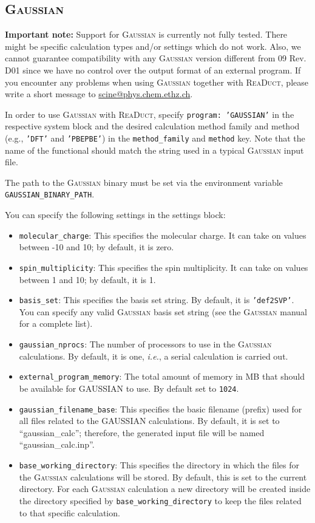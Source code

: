 \documentclass[]{tufte-book}
\begin{document}
\subsection{\textsc{Gaussian}}

\textbf{Important note:} Support for \textsc{Gaussian}\cite{gaussian09} is currently not fully tested. There might be specific calculation
types and/or settings which do not work. Also, we cannot guarantee compatibility with any \textsc{Gaussian} version different from
09 Rev. D01 since we have no control over the output format of an external program. If you encounter any problems when
using \textsc{Gaussian} together with \textsc{ReaDuct}, please write a short message to \href{scine@phys.chem.ethz.ch}{scine@phys.chem.ethz.ch}.

In order to use \textsc{Gaussian} with \textsc{ReaDuct}, specify \texttt{program: 'GAUSSIAN'} in the respective system block and the desired
calculation method family and method (e.g., \texttt{'DFT'} and \texttt{'PBEPBE'}) in the \texttt{method\_family} and \texttt{method} key.
Note that the name of the functional should match the string used in a typical \textsc{Gaussian} input file.

The path to the \textsc{Gaussian} binary must be set via the environment variable \texttt{GAUSSIAN\_BINARY\_PATH}.

You can specify the following settings in the settings block:
\begin{itemize}
\item \texttt{molecular\_charge}: This specifies the molecular charge. It can take on values between -10 and 10; by default,
it is zero.
\item \texttt{spin\_multiplicity}: This specifies the spin multiplicity. It can take on values between 1 and 10; by default,
it is 1.
\item \texttt{basis\_set}: This specifies the basis set string. By default, it is \texttt{'def2SVP'}. You can specify
any valid \textsc{Gaussian} basis set string (see the \textsc{Gaussian} manual for a complete list).
\item \texttt{gaussian\_nprocs}: The number of processors to use in the \textsc{Gaussian} calculations. By default, it is one, \textit{i.e.},
a serial calculation is carried out.
\item \texttt{external\_program\_memory}: The total amount of memory in MB that should be available for GAUSSIAN to use.
By default set to \texttt{1024}.
\item \texttt{gaussian\_filename\_base}: This specifies the basic filename (prefix) used for all files related to the GAUSSIAN calculations.
By default, it is set to ``gaussian\_calc''; therefore, the generated input file will be named ``gaussian\_calc.inp''.
\item \texttt{base\_working\_directory}: This specifies the directory in which the files for the \textsc{Gaussian} calculations will
be stored. By default, this is set to the current directory. For each \textsc{Gaussian} calculation a new directory will be
created inside the directory specified by \texttt{base\_working\_directory} to keep the files related to that specific
calculation.
\end{itemize}
\end{document}
